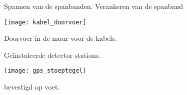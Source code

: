 \begin{figure}
    \centering
    \caption{Spannen van de spanbanden. Verankeren van de spanband}
\end{figure}

\begin{figure}
    \centering
    \texttt{[image: kabel\_doorvoer]}
    \label{fig:kabel_doorvoer}
    \caption{Doorvoer in de muur voor de kabels.}
\end{figure}

\begin{figure}
    \centering
    \caption{Geïnstaleerde detector stations.}
\end{figure}

\begin{figure}
    \centering
    \texttt{[image: gps\_stoeptegel]}
    \label{fig:gps_stoeptegel}
    \caption{\gps bevestigd op voet.}
\end{figure}



